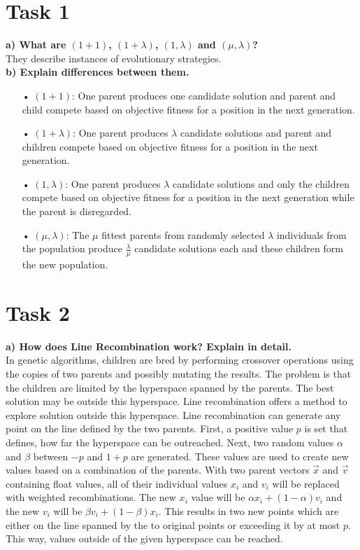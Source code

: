 \documentclass[12pt,letterpaper]{article}
\begin{document}
\section*{Task 1}
\textbf{a) What are $(1+1)$, $(1 + \lambda)$, $(1,\lambda)$ and $(\mu,\lambda)$?}\\
They describe instances of evolutionary strategies.\\

\textbf{b) Explain differences between them.}
\begin{enumerate}
\item[•] $(1+1)$: One parent produces one candidate solution and parent and child compete based on objective fitness for a position in the next generation.
\item[•] $(1 + \lambda)$: One parent produces $\lambda$ candidate solutions and parent and children compete based on objective fitness for a position in the next generation.
\item[•] $(1 , \lambda)$: One parent produces $\lambda$ candidate solutions and only the children compete based on objective fitness for a position in the next generation while the parent is disregarded.
\item[•] $(\mu , \lambda)$: The $\mu$ fittest parents from randomly selected $\lambda$ individuals from the population produce $\frac{\lambda}{\mu}$  candidate solutions each and these children form the new population.
\end{enumerate}

\section*{Task 2}
\textbf{a) How does Line Recombination work? Explain in detail.} \\
In genetic algorithms, children are bred by performing crossover operations using the copies of two parents and possibly mutating the results. The problem is that the children are limited by the hyperspace spanned by the parents. The best solution may be outside this hyperspace. Line recombination offers a method to explore solution outside this hyperspace. Line recombination can generate any point on the line defined by the two parents. First, a positive value $p$ is set that defines, how far the hyperspace can be outreached. Next, two  random values $\alpha$ and $\beta$ between $-p$ and $1+p$ are generated. These values are used to create new values based on a combination of the parents. With two parent vectors $\overrightarrow{x}$ and $\overrightarrow{v}$ containing float values, all of their individual values $x_{i}$ and $v_{i}$ will be replaced with weighted recombinations. The new $x_{i}$ value will be $\alpha x_{i} + (1 - \alpha)v_{i}$ and the new $v_{i}$ will be $\beta v_{i} + (1 - \beta)x_{i}$. This results in two new points which are either on the line spanned by the to original points or exceeding it by at most $p$. This way, values outside of the given hyperspace can be reached.  \\
\end{document}
